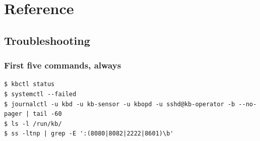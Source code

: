 \part{Reference}
\chapter{Troubleshooting}
\label{ch:trouble}
\section{First five commands, always}
\begin{lstlisting}[style=console]
$ kbctl status
$ systemctl --failed
$ journalctl -u kbd -u kb-sensor -u kbopd -u sshd@kb-operator -b --no-pager | tail -60
$ ls -l /run/kb/
$ ss -ltnp | grep -E ':(8080|8082|2222|8601)\b'
\end{lstlisting}


